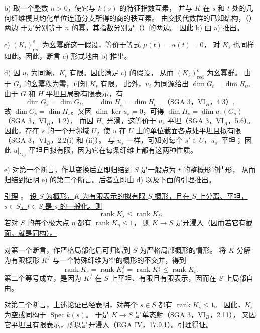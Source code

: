 \smallskip
\noindent
b) 取一个整数 $n>0$，使它与 $k(s)$ 的特征指数互素，
并与 $K$ 在 $s$ 和 $t$ 处的几何纤维模其约化单位连通分支所得的商的秩互素。
由交换代数群的已知结构，（）两边
于是分别等于 $n$ 的幂，其指数分别是（）的两边。
因此 b) 由 a) 推出。

\smallskip
\noindent
c) $(K_{\bar t})^o_{\mathrm{red}}$ 为幺幂群这一假设，等价于等式 $\mu(t)=\alpha(t)=0$，
对 $K_{\bar s}$ 也同样如此。因此，断言 c) 形式地由 b) 推出。

\smallskip
\noindent
d) 因 $u_t$ 为同源，$K_t$ 有限。因此满足 c) 的假设，
从而 $(K_{\bar s})^o_{\mathrm{red}}$ 为幺幂群。
由于 $G_s$ 的幺幂秩为零，可知 $K_s$ 有限。
此外，$u_t$ 为同源给出 $\dim G_t=\dim H_t$。
由于 $G$ 和 $H$ 平坦且局部有限表示，有
\[
 \dim G_s=\dim G_t,\qquad \dim H_s=\dim H_t
 \quad\text{（SGA 3，VI$_B$，4.3）},
\]
故 $\dim G_s=\dim H_s$。又因 $\dim\ker u_s=0$，可得
$\dim H_s=\dim u_s(G_s)$（SGA 3，VI$_B$，1.2），
而因 $H_s$ 光滑，这等价于 $u_s$ 平坦（SGA 3，VI$_A$，5.6）。
因此，存在 $s$ 的一个开邻域 $U$，使 $u$ 在 $U$ 上的单位截面各点处平坦且拟有限
（SGA 3，VI$_B$，2.2(i) 和 (ii)）。
与 $u_s$ 一样，可知对每个 $s'\in U$，$u_{s'}$ 平坦；
因此 $u|_{G_U}$ 平坦且拟有限，因为它在每条纤维上都有这两种性质。

\smallskip
\noindent
e) 对第一个断言，作基变换后立即归结到 $S$ 是一般点为 $t$ 的整概形的情形，
从而归结到证明 e) 的第二个断言。后者立即由 d) 以及下面的引理推出。

\medskip
\noindent
\underline{引理} 。
\underline{设 $S$ 为概形，$K$ 为有限表示的拟有限 $S$ 概形，且在 $S$ 上分离、平坦，
$s\in S$，$t\in S$ 是 $s$ 的一般化。则}
\[
 \operatorname{rank}K_s\leq \operatorname{rank}K_t.
\]
\underline{若对 $S$ 的每个极大点 $\eta$ 都有 $\operatorname{rank}K_\eta\leq1$，
则 $K\longrightarrow S$ 是开浸入（因而若它有截面，就是同构）。}

对第一个断言，作严格局部化后可归结到 $S$ 为严格局部概形的情形。
将 $K$ 分解为有限概形 $K^f$ 与一个特殊纤维为空的概形的不交并，得到
\[
 \operatorname{rank}K_s
 =\operatorname{rank}K^f_s
 =\operatorname{rank}K^f_t
 \leq\operatorname{rank}K_t.
\]
第二个等号成立，是因为 $K^f$ 在 $S$ 上平坦、有限且有限表示，因而在 $S$ 上局部自由。

对第二个断言，上述论证已经表明，对每个 $s\in S$ 都有 $\operatorname{rank}K_s\leq1$。
因此，$K_s$ 为空或同构于 $\operatorname{Spec}k(s)$。
于是 $K\longrightarrow S$ 是单态射（SGA 3，VI$_B$，2.11），
又因它平坦且有限表示，所以是开浸入（EGA IV，17.9.1）。引理得证。

